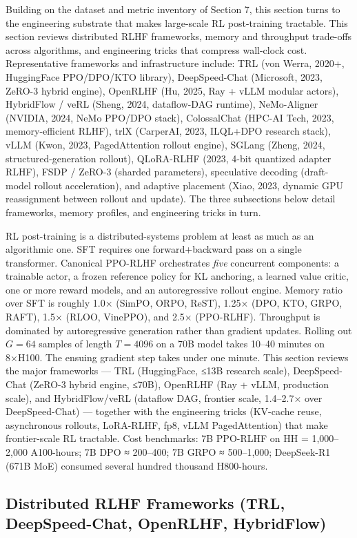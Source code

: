 \documentclass{article}
\begin{document}
Building on the dataset and metric inventory of Section 7, this section turns to the engineering substrate that makes large-scale RL post-training tractable. This section reviews distributed RLHF frameworks, memory and throughput trade-offs across algorithms, and engineering tricks that compress wall-clock cost. Representative frameworks and infrastructure include: TRL (von Werra, 2020+, HuggingFace PPO/DPO/KTO library), DeepSpeed-Chat (Microsoft, 2023, ZeRO-3 hybrid engine), OpenRLHF (Hu, 2025, Ray + vLLM modular actors), HybridFlow / veRL (Sheng, 2024, dataflow-DAG runtime), NeMo-Aligner (NVIDIA, 2024, NeMo PPO/DPO stack), ColossalChat (HPC-AI Tech, 2023, memory-efficient RLHF), trlX (CarperAI, 2023, ILQL+DPO research stack), vLLM (Kwon, 2023, PagedAttention rollout engine), SGLang (Zheng, 2024, structured-generation rollout), QLoRA-RLHF (2023, 4-bit quantized adapter RLHF), FSDP / ZeRO-3 (sharded parameters), speculative decoding (draft-model rollout acceleration), and adaptive placement (Xiao, 2023, dynamic GPU reassignment between rollout and update). The three subsections below detail frameworks, memory profiles, and engineering tricks in turn.

RL post-training is a distributed-systems problem at least as much as an algorithmic one. SFT requires one forward+backward pass on a single transformer. Canonical PPO-RLHF orchestrates \emph{five} concurrent components: a trainable actor, a frozen reference policy for KL anchoring, a learned value critic, one or more reward models, and an autoregressive rollout engine. Memory ratio over SFT is roughly 1.0× (SimPO, ORPO, ReST), 1.25× (DPO, KTO, GRPO, RAFT), 1.5× (RLOO, VinePPO), and 2.5× (PPO-RLHF). Throughput is dominated by autoregressive generation rather than gradient updates. Rolling out \(G = 64\) samples of length \(T = 4096\) on a 70B model takes 10--40 minutes on 8×H100. The ensuing gradient step takes under one minute. This section reviews the major frameworks --- TRL (HuggingFace, ≤13B research scale), DeepSpeed-Chat (ZeRO-3 hybrid engine, ≤70B), OpenRLHF (Ray + vLLM, production scale), and HybridFlow/veRL (dataflow DAG, frontier scale, 1.4--2.7× over DeepSpeed-Chat) --- together with the engineering tricks (KV-cache reuse, asynchronous rollouts, LoRA-RLHF, fp8, vLLM PagedAttention) that make frontier-scale RL tractable. Cost benchmarks: 7B PPO-RLHF on HH = 1,000--2,000 A100-hours; 7B DPO ≈ 200--400; 7B GRPO ≈ 500--1,000; DeepSeek-R1 (671B MoE) consumed several hundred thousand H800-hours.

\subsection{Distributed RLHF Frameworks (TRL, DeepSpeed-Chat, OpenRLHF, HybridFlow)}\label{distributed-rlhf-frameworks-trl-deepspeed-chat-openrlhf-hybridflow}
\end{document}
